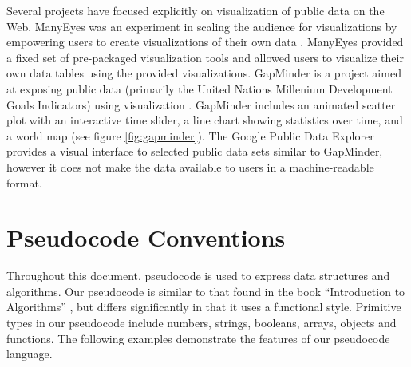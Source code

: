 %
Several projects have focused explicitly on visualization of public data on the Web. ManyEyes was an experiment in scaling the audience for visualizations by empowering users to create visualizations of their own data \cite{viegas2007manyeyes}. ManyEyes provided a fixed set of pre-packaged visualization tools and allowed users to visualize their own data tables using the provided visualizations. GapMinder is a project aimed at exposing public data (primarily the United Nations Millenium Development Goals Indicators) using visualization \cite{rosling2005new}. GapMinder includes an animated scatter plot with an interactive time slider, a line chart showing statistics over time, and a world map (see figure \ref{fig:gapminder}). The Google Public Data Explorer provides a visual interface to selected public data sets similar to GapMinder, however it does not make the data available to users in a machine-readable format.


\section{Pseudocode Conventions}
Throughout this document, pseudocode is used to express data structures and algorithms. Our pseudocode is similar to that found in the book ``Introduction to Algorithms'' \cite{cormen2009introduction}, but differs significantly in that it uses a functional style. Primitive types in our pseudocode include numbers, strings, booleans, arrays, objects and functions. The following examples demonstrate the features of our pseudocode language.

